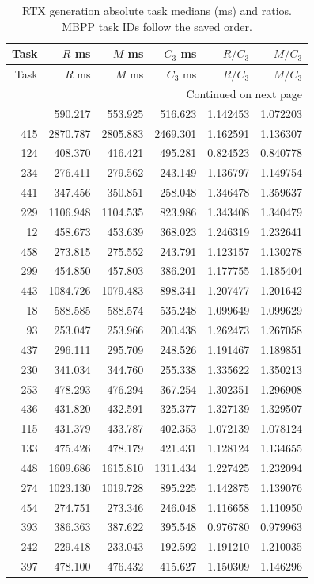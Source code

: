 \begingroup\small
\begin{longtable}{@{}rrrrrr@{}}
\caption{RTX generation absolute task medians (ms) and ratios. MBPP task IDs follow the saved order.}\label{tab:rtx_task_generation}\\
\toprule
Task & $R$ ms & $M$ ms & $C_3$ ms & $R/C_3$ & $M/C_3$\\\midrule
\endfirsthead
\toprule
Task & $R$ ms & $M$ ms & $C_3$ ms & $R/C_3$ & $M/C_3$\\\midrule
\endhead
\midrule\multicolumn{6}{r}{Continued on next page}\\
\endfoot
\bottomrule
\endlastfoot
439 & 590.217 & 553.925 & 516.623 & 1.142453 & 1.072203\\
415 & 2870.787 & 2805.883 & 2469.301 & 1.162591 & 1.136307\\
124 & 408.370 & 416.421 & 495.281 & 0.824523 & 0.840778\\
234 & 276.411 & 279.562 & 243.149 & 1.136797 & 1.149754\\
441 & 347.456 & 350.851 & 258.048 & 1.346478 & 1.359637\\
229 & 1106.948 & 1104.535 & 823.986 & 1.343408 & 1.340479\\
12 & 458.673 & 453.639 & 368.023 & 1.246319 & 1.232641\\
458 & 273.815 & 275.552 & 243.791 & 1.123157 & 1.130278\\
299 & 454.850 & 457.803 & 386.201 & 1.177755 & 1.185404\\
443 & 1084.726 & 1079.483 & 898.341 & 1.207477 & 1.201642\\
18 & 588.585 & 588.574 & 535.248 & 1.099649 & 1.099629\\
93 & 253.047 & 253.966 & 200.438 & 1.262473 & 1.267058\\
437 & 296.111 & 295.709 & 248.526 & 1.191467 & 1.189851\\
230 & 341.034 & 344.760 & 255.338 & 1.335622 & 1.350213\\
253 & 478.293 & 476.294 & 367.254 & 1.302351 & 1.296908\\
436 & 431.820 & 432.591 & 325.377 & 1.327139 & 1.329507\\
115 & 431.379 & 433.787 & 402.353 & 1.072139 & 1.078124\\
133 & 475.426 & 478.179 & 421.431 & 1.128124 & 1.134655\\
448 & 1609.686 & 1615.810 & 1311.434 & 1.227425 & 1.232094\\
274 & 1023.130 & 1019.728 & 895.225 & 1.142875 & 1.139076\\
454 & 274.751 & 273.346 & 246.048 & 1.116658 & 1.110950\\
393 & 386.363 & 387.622 & 395.548 & 0.976780 & 0.979963\\
242 & 229.418 & 233.043 & 192.592 & 1.191210 & 1.210035\\
397 & 478.100 & 476.432 & 415.627 & 1.150309 & 1.146296\\
\end{longtable}

\endgroup
